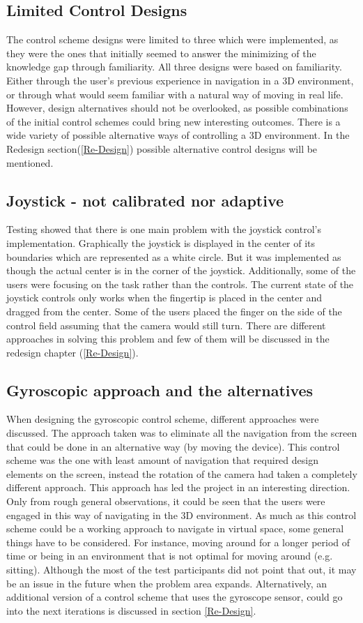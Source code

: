 \subsection*{Limited Control Designs} 
The control scheme designs were limited to three which were implemented, as they were the ones that initially seemed to answer the minimizing of the knowledge gap through familiarity. All three designs were based on familiarity. Either through the user's previous experience in navigation in a 3D environment, or through what would seem familiar with a natural way of moving in real life. However, design alternatives should not be overlooked, as possible combinations of the initial control schemes could bring new interesting outcomes. There is a wide variety of possible alternative ways of controlling a 3D environment. In the Redesign section(\ref{Re-Design}) possible alternative control designs will be mentioned.

\subsection*{Joystick - not calibrated nor adaptive}
Testing showed that there is one main problem with the joystick control's implementation. Graphically the joystick is displayed in the center of its boundaries which are represented as a white circle. But it was implemented as though the actual center is in the corner of the joystick. Additionally, some of the users were focusing on the task rather than the controls. The current state of the joystick controls only works when the fingertip is placed in the center and dragged from the center. Some of the users placed the finger on the side of the control field assuming that the camera would still turn. There are different approaches in solving this problem and few of them will be discussed in the redesign chapter (\ref{Re-Design}). 

\subsection*{Gyroscopic approach and the alternatives}
When designing the gyroscopic control scheme, different approaches were discussed. The approach taken was to eliminate all the navigation from the screen that could be done in an alternative way (by moving the device). This control scheme was the one with least amount of navigation that required design elements on the screen, instead the rotation of the camera had taken a completely different approach. This approach has led the project in an interesting direction. Only from rough general observations, it could be seen that the users were engaged in this way of navigating in the 3D environment.
As much as this control scheme could be a working approach to navigate in virtual space, some general things have to be considered. For instance, moving around for a longer period of time or being in an environment that is not optimal for moving around (e.g. sitting). Although the most of the test participants did not point that out, it may be an issue in the future when the problem area expands.
Alternatively, an additional version of a control scheme that uses the gyroscope sensor, could go into the next iterations is discussed in section \ref{Re-Design}.

